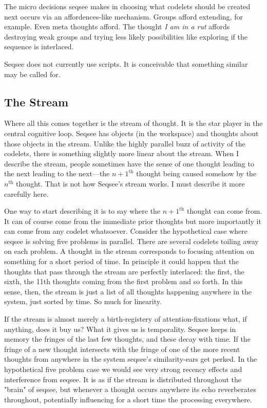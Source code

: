 The micro decisions seqsee makes in choosing what codelets should be created next occurs via an affordences-like mechanism. Groups afford extending, for example.  Even meta thoughts afford.  The thought \emph{I am in a rut} affords destroying weak groups and trying less likely possibilities like exploring if the sequence is interlaced.

Seqsee does not currently use scripts.  It is conceivable that something similar may be called for.

\subsection{The Stream}
\label{sec:stream}

Where all this comes together is the stream of thought.  It is the star player in the central cognitive loop.  Seqsee has objects (in the workspace) and thoughts about those objects in the stream.  Unlike the highly parallel buzz of activity of the codelets, there is something slightly more linear about the stream.  When I describe the stream, people sometimes have the sense of one thought leading to the next leading to the next---the $n+1^{\textrm{th}}$ thought being caused somehow by the $n^\textrm{th}$ thought.  That is not how Seqsee's stream works.  I must describe it more carefully here.

One way to start describing it is to say where the $n+1^{\textrm{th}}$ thought can come from.  It can of course come  from the immediate prior thoughts but more importantly it can come from any codelet whatsoever.  Consider the hypothetical case where seqsee is solving five problems in parallel.  There are several codelets toiling away on each problem.  A thought in the stream corresponds to focusing attention on something for a short period of time.  In principle it could happen that the thoughts that pass through the stream are perfectly interlaced: the first, the sixth, the 11th thoughts coming from the first problem and so forth.  In this sense, then, the stream is just a list of all thoughts happening anywhere in the system, just sorted by time.  So much for linearity.

If the stream is almost merely a birth-registery of attention-fixations what, if anything, does it buy us? What it gives us is temporality.  Seqsee keeps in memory the fringes of the last few thoughts, and these decay with time.  If the fringe of a new thought intersects with the fringe of one of the more recent thoughts from anywhere in the system seqsee's similarity-ears get perked.  In the hypothetical five problem case we would see very strong recency effects and interference from seqsee.  It is as if the stream is distributed throughout the "brain" of seqsee, but whenever a thought occurs anywhere its echo reverberates throughout, potentially influencing for a short time the processing everywhere.

